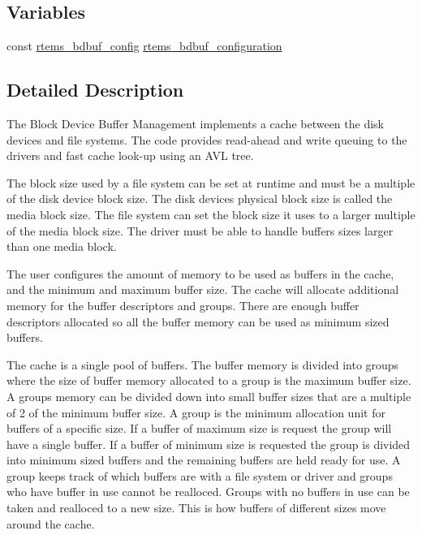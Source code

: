 \subsection*{Variables}
\begin{DoxyCompactItemize}
\item 
const \mbox{\hyperlink{structrtems__bdbuf__config}{rtems\+\_\+bdbuf\+\_\+config}} \mbox{\hyperlink{group__rtems__bdbuf_gac1ab295c43675e17b20a7af3956c2a72}{rtems\+\_\+bdbuf\+\_\+configuration}}
\end{DoxyCompactItemize}


\subsection{Detailed Description}
The Block Device Buffer Management implements a cache between the disk devices and file systems. The code provides read-\/ahead and write queuing to the drivers and fast cache look-\/up using an A\+VL tree.

The block size used by a file system can be set at runtime and must be a multiple of the disk device block size. The disk device\textquotesingle{}s physical block size is called the media block size. The file system can set the block size it uses to a larger multiple of the media block size. The driver must be able to handle buffers sizes larger than one media block.

The user configures the amount of memory to be used as buffers in the cache, and the minimum and maximum buffer size. The cache will allocate additional memory for the buffer descriptors and groups. There are enough buffer descriptors allocated so all the buffer memory can be used as minimum sized buffers.

The cache is a single pool of buffers. The buffer memory is divided into groups where the size of buffer memory allocated to a group is the maximum buffer size. A group\textquotesingle{}s memory can be divided down into small buffer sizes that are a multiple of 2 of the minimum buffer size. A group is the minimum allocation unit for buffers of a specific size. If a buffer of maximum size is request the group will have a single buffer. If a buffer of minimum size is requested the group is divided into minimum sized buffers and the remaining buffers are held ready for use. A group keeps track of which buffers are with a file system or driver and groups who have buffer in use cannot be realloced. Groups with no buffers in use can be taken and realloced to a new size. This is how buffers of different sizes move around the cache.

